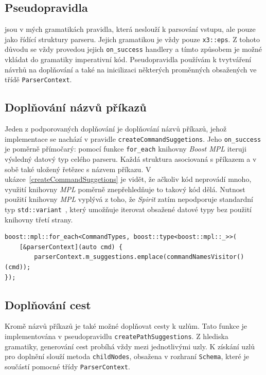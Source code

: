 \documentclass[thesis=B,czech,hidelinks]{FITthesis}[2019/03/06]
\begin{document}
\subsection{Pseudopravidla}
 jsou v mých gramatikách pravidla, která neslouží k parsování vstupu, ale pouze jako řídící struktury parseru. Jejich gramatikou je vždy pouze \texttt{x3::eps}. Z tohoto důvodu se vždy provedou jejich \texttt{on\_success} handlery a tímto způsobem je možné vkládat do gramatiky imperativní kód. Pseudopravidla používám k tvytváření návrhů na doplňování a také na inicilizaci některých proměnných obsažených ve třídě \texttt{ParserContext}.


\subsection{Doplňování názvů příkazů}
Jeden z podporovaných doplňování je doplňování názvů příkazů, jehož implementace se nachází v pravidle \texttt{createCommandSuggetions}. Jeho \texttt{on\_success} je poměrně přímočarý: pomocí funkce \texttt{for\_each} knihovny \textit{Boost MPL} iteruji výsledný datový typ celého parseru. Každá struktura asociovaná s příkazem a v sobě také uložený řetězec s názvem příkazu. V ukázce~\ref{createCommandSuggetions} je vidět, že ačkoliv kód neprovádí mnoho, využití knihovny \textit{MPL} poměrně znepřehledňuje to takový kód dělá. Nutnost použití knihovny \textit{MPL} vyplývá z toho, že \textit{Spirit} zatím nepodporuje standardní typ \texttt{std::variant}~\cite{boost-variant}, který umožňuje iterovat obsažené datové typy bez použití knihovny třetí strany.

\begin{listing}
\begin{verbatim}
boost::mpl::for_each<CommandTypes, boost::type<boost::mpl::_>>(
    [&parserContext](auto cmd) {
        parserContext.m_suggestions.emplace(commandNamesVisitor()(cmd));
});
\end{verbatim}
\end{listing}


\subsection{Doplňování cest}
Kromě názvů příkazů je také možné doplňovat cesty k uzlům. Tato funkce je implementována v pseudopravidlu \texttt{createPathSuggestions}. Z hlediska gramatiky, generování cest probíhá vždy mezi jednotlivými uzly. K získání uzlů pro doplnění slouží metoda \texttt{childNodes}, obsažena v rozhraní \texttt{Schema}, které je součástí pomocné třídy \texttt{ParserContext}.
\end{document}
